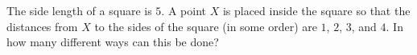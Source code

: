 The side length of a square is $5$. A point $X$ is placed inside the square so that the distances from $X$ to the sides of the square (in some order) are $1$, $2$, $3$, and $4$. In how many different ways can this be done?
